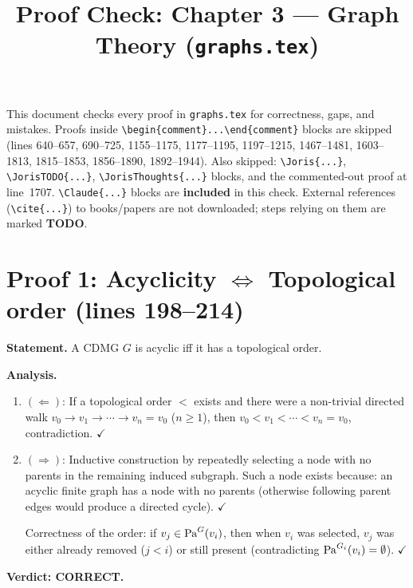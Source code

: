 \documentclass{article}
\title{Proof Check: Chapter 3 --- Graph Theory (\texttt{graphs.tex})}
\date{}
\begin{document}
\maketitle

This document checks every proof in \texttt{graphs.tex} for correctness,
gaps, and mistakes.
Proofs inside \verb|\begin{comment}...\end{comment}| blocks are skipped
(lines 640--657, 690--725, 1155--1175, 1177--1195, 1197--1215, 1467--1481,
1603--1813, 1815--1853, 1856--1890, 1892--1944).
Also skipped: \verb|\Joris{...}|, \verb|\JorisTODO{...}|,
\verb|\JorisThoughts{...}| blocks, and the commented-out proof at line~1707.
\verb|\Claude{...}| blocks are \textbf{included} in this check.
External references (\verb|\cite{...}|) to books/papers are not downloaded;
steps relying on them are marked \textbf{TODO}.

\section{Proof 1: Acyclicity $\iff$ Topological order (lines 198--214)}

\textbf{Statement.} A CDMG $G$ is acyclic iff it has a topological order.

\textbf{Analysis.}
\begin{enumerate}[leftmargin=*]
  \item $(\Leftarrow)$: If a topological order $<$ exists and there were a non-trivial
    directed walk $v_0 \to v_1 \to \cdots \to v_n = v_0$ ($n\ge 1$),
    then $v_0 < v_1 < \cdots < v_n = v_0$, contradiction.  $\checkmark$
  \item $(\Rightarrow)$: Inductive construction by repeatedly selecting a node with
    no parents in the remaining induced subgraph.  Such a node exists because:
    an acyclic finite graph has a node with no parents (otherwise following parent
    edges would produce a directed cycle).  $\checkmark$

    Correctness of the order: if $v_j \in \mathrm{Pa}^G(v_i)$, then when $v_i$ was
    selected, $v_j$ was either already removed ($j < i$) or still present
    (contradicting $\mathrm{Pa}^{G_i}(v_i)=\emptyset$).  $\checkmark$
\end{enumerate}

\textbf{Verdict: CORRECT.}
\end{document}
